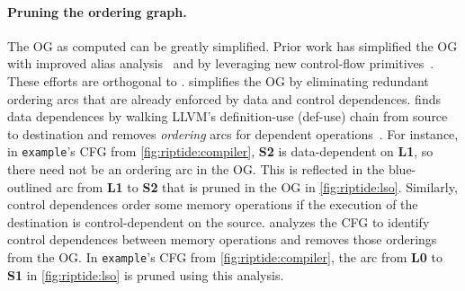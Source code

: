 \paragraph{Pruning the ordering graph.} 
The OG as computed can be greatly simplified.
% 
Prior work has simplified the OG with improved alias analysis~\cite{hind-aa} and by leveraging new control-flow primitives~\cite{midkiff-padua,doacross}.
% 
These efforts are orthogonal to \riptide.
% 
\riptide simplifies the OG by eliminating redundant
ordering arcs that are already enforced by data and control dependences.
%
% 
\riptide finds data dependences by walking LLVM's definition-use (def-use)
chain from source to destination and removes \emph{ordering} arcs for dependent operations~\cite{nachos}.
%
For instance, in \texttt{example}'s CFG from \autoref{fig:riptide:compiler}, 
\textbf{S2} is data-dependent on \textbf{L1}, so there need not
be an ordering arc in the OG. This is reflected in the blue-outlined arc
from \textbf{L1} to \textbf{S2} that is pruned in the OG in \autoref{fig:riptide:lso}.
%
Similarly, control dependences order some memory operations if the execution of
the destination is control-dependent on the source.
%
%
\riptide analyzes the CFG to identify control dependences
between memory operations and removes those orderings from the OG.
%
In \texttt{example}'s CFG from \autoref{fig:riptide:compiler}, the
arc from \textbf{L0} to \textbf{S1} in \autoref{fig:riptide:lso} is pruned using this analysis.

\figRipTideLSO

